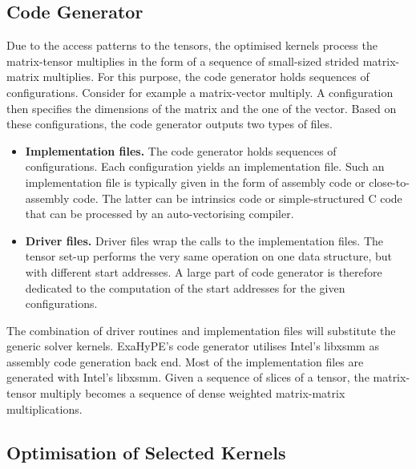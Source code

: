\documentclass{acm_proc_article-sp}
\begin{document}
\subsection{Code Generator}\label{sec3:1}
Due to the access patterns to the tensors, the optimised kernels process the matrix-tensor multiplies in the form of a sequence of small-sized strided matrix-matrix multiplies. For this purpose, the code generator holds sequences of configurations. Consider for example a matrix-vector multiply. A configuration then specifies the dimensions of the matrix and the one of the vector. Based on these configurations, the code generator outputs two types of files.
\begin{itemize}
\item \textbf{Implementation files.} The code generator holds sequences of configurations. Each configuration yields an implementation file. Such an implementation file is typically given in the form of assembly code or close-to-assembly code. The latter can be intrinsics code or simple-structured C code that can be processed by an auto-vectorising compiler.
\item \textbf{Driver files.} Driver files wrap the calls to the implementation files. The tensor set-up performs the very same operation on one data structure, but with different start addresses. A large part of code generator is therefore dedicated to the computation of the start addresses for the given configurations. %
\end{itemize}
The combination of driver routines and implementation files will substitute the generic solver kernels. ExaHyPE's code generator utilises Intel's libxsmm as assembly code generation back end. Most of the implementation files are generated with Intel's libxsmm. Given a sequence of slices of a tensor, the matrix-tensor multiply becomes a sequence of dense weighted matrix-matrix multiplications. %




\subsection{Optimisation of Selected Kernels}
\end{document}
